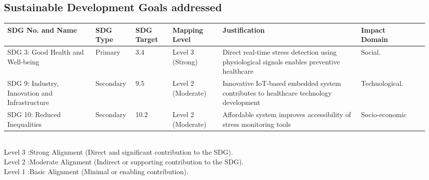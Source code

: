 \begin{appendices}
\chapter{Sustainable Development Goals addressed}
{\begin{table}[h]
\centering
\begin{tabular}{|p{2cm}|p{2cm}|p{2cm}|p{2cm}|p{2cm}|p{2cm}|p{2.2cm}|p{2.3cm}|}
\hline 
{SDG No. and Name} & {\bf SDG Type}  & {\bf SDG Target} & {\bf Mapping Level} & {\bf Justification} & {\bf Impact Domain}\\ \hline
SDG 3: Good
Health and
Well-being &  Primary & 3.4 & Level 3
(Strong) & Direct real-time stress detection using physiological signals enables
preventive healthcare & Social. \\ \hline
SDG 9: Industry, Innovation and Infrastructure &  Secondary & 9.5 & Level 2  (Moderate) & 
Innovative IoT-based embedded system contributes to healthcare technology development & Technological. \\ \hline
SDG 10: Reduced Inequalities & Secondary & 10.2 & Level 2  (Moderate) & Affordable system improves accessibility of stress monitoring tools & Socio-economic \\  \hline

\end{tabular}
\end{table}}
 \\ Level 3 :Strong Alignment (Direct and significant contribution to the SDG).\\
Level 2 :Moderate Alignment (Indirect or supporting contribution to the SDG).\\
Level 1 :Basic Alignment (Minimal or enabling contribution).\\


\end{appendices}
